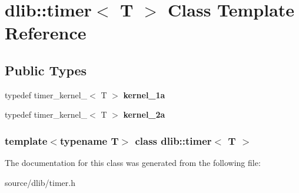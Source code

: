 \hypertarget{classdlib_1_1timer}{
\section{dlib::timer$<$ T $>$ Class Template Reference}
\label{classdlib_1_1timer}
}
\subsection*{Public Types}
\begin{DoxyCompactItemize}
\item 
\hypertarget{classdlib_1_1timer_a024a6e6d2cd2bc6f91891f18101d34be}{
typedef timer\_\-kernel\_$<$ T $>$ {\bfseries kernel\_\-1a}}
\label{classdlib_1_1timer_a024a6e6d2cd2bc6f91891f18101d34be}

\item 
\hypertarget{classdlib_1_1timer_ab269a67a2f5acb2548839f2a55d935db}{
typedef timer\_\-kernel\_$<$ T $>$ {\bfseries kernel\_\-2a}}
\label{classdlib_1_1timer_ab269a67a2f5acb2548839f2a55d935db}

\end{DoxyCompactItemize}
\subsubsection*{template$<$typename T$>$ class dlib::timer$<$ T $>$}



The documentation for this class was generated from the following file:\begin{DoxyCompactItemize}
\item 
source/dlib/timer.h\end{DoxyCompactItemize}
